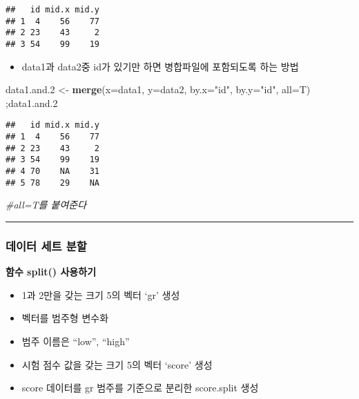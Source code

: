 \documentclass[]{article}
\newenvironment{Shaded}{\begin{snugshade}}{\end{snugshade}}
\newcommand{\KeywordTok}[1]{\textcolor[rgb]{0.13,0.29,0.53}{\textbf{#1}}}
\newcommand{\DataTypeTok}[1]{\textcolor[rgb]{0.13,0.29,0.53}{#1}}
\newcommand{\DecValTok}[1]{\textcolor[rgb]{0.00,0.00,0.81}{#1}}
\newcommand{\StringTok}[1]{\textcolor[rgb]{0.31,0.60,0.02}{#1}}
\newcommand{\CommentTok}[1]{\textcolor[rgb]{0.56,0.35,0.01}{\textit{#1}}}
\newcommand{\NormalTok}[1]{#1}
\providecommand{\tightlist}{%
  \setlength{\itemsep}{0pt}\setlength{\parskip}{0pt}}
\begin{document}
\begin{verbatim}
##   id mid.x mid.y
## 1  4    56    77
## 2 23    43     2
## 3 54    99    19
\end{verbatim}

\begin{itemize}
\tightlist
\item
  data1과 data2중 id가 있기만 하면 병합파일에 포함되도록 하는 방법
\end{itemize}

\begin{Shaded}
\begin{Highlighting}[]
\NormalTok{data1.and.}\DecValTok{2}\NormalTok{ <-}\StringTok{ }\KeywordTok{merge}\NormalTok{(}\DataTypeTok{x=}\NormalTok{data1, }\DataTypeTok{y=}\NormalTok{data2, }\DataTypeTok{by.x=}\StringTok{"id"}\NormalTok{, }\DataTypeTok{by.y=}\StringTok{"id"}\NormalTok{, }\DataTypeTok{all=}\NormalTok{T) ;data1.and.}\DecValTok{2}
\end{Highlighting}
\end{Shaded}

\begin{verbatim}
##   id mid.x mid.y
## 1  4    56    77
## 2 23    43     2
## 3 54    99    19
## 4 70    NA    31
## 5 78    29    NA
\end{verbatim}

\begin{Shaded}
\begin{Highlighting}[]
  \CommentTok{#all=T를 붙여준다}
\end{Highlighting}
\end{Shaded}

\begin{center}\rule{0.5\linewidth}{\linethickness}\end{center}

\subsubsection{데이터 세트 분할}\label{--}

\textbf{함수 split() 사용하기}

\begin{itemize}
\tightlist
\item
  1과 2만을 갖는 크기 5의 벡터 `gr' 생성
\item
  벡터를 범주형 변수화
\item
  범주 이름은 ``low'', ``high''
\item
  시험 점수 값을 갖는 크기 5의 벡터 `score' 생성
\item
  score 데이터를 gr 범주를 기준으로 분리한 score.split 생성
\end{itemize}
\end{document}
